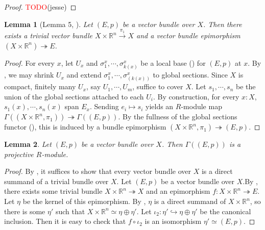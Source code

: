 \documentclass[11pt]{article}
\newcommand{\R}{\mathbb{R}}
\newcommand{\remph}[1]{\textcolor{red}{#1}}
\newcommand{\TODO}{\remph{TODO}}
\theoremstyle{plain}
\newtheorem{lemma}{Lemma}[section]
\theoremstyle{definition}
\begin{document}
\begin{proof}
  \TODO(jesse)
\end{proof}

\begin{lemma}[Lemma 5, \cite{swan1962vector}]\label{lemma:free-resolution}
  Let \((E,p)\) be a vector bundle over \(X\). Then there exists a trivial vector bundle \(X \times \R^n \overset{\pi_1}{\to} X\) and a vector bundle epimorphism \((X \times \R^n) \twoheadrightarrow E\).
\end{lemma}

\begin{proof}
  For every \(x\), let \(U_x\) and \(\sigma^x_1, \cdots, \sigma^x_{k(x)}\) be a local base () for \((E,p)\) at \(x\). By , we may shrink \(U_x\) and extend \(\sigma^x_1, \cdots, \sigma^x_{(k(x))}\) to global sections. Since \(X\) is compact, finitely many \(U_x\), say \(U_1, \cdots, U_m\), suffice to cover \(X\). Let \(s_1, \cdots, s_n\) be the union of the global sections attached to each \(U_i\). By construction, for every \(x : X\), \(s_1(x), \cdots, s_n(x)\) span \(E_x\). Sending \(e_i \mapsto s_i\) yields an \(R\)-module map \(\Gamma((X \times \R^n, \pi_1)) \twoheadrightarrow \Gamma((E,p))\). By the fullness of the global sections functor (), this is induced by a bundle epimorphism \((X \times \R^n, \pi_1) \twoheadrightarrow (E,p)\).
\end{proof}


\begin{lemma}
  \label{lemma:global-sections-projective}
  Let \((E,p)\) be a vector bundle over \(X\). Then \(\Gamma((E,p))\) is a projective \(R\)-module.
\end{lemma}

\begin{proof}
  By , it suffices to show that every vector bundle over \(X\) is a direct summand of a trivial bundle over \(X\). Let \((E,p)\) be a vector bundle over \(X\).By , there exists some trivial bundle \(X \times \R^n \twoheadrightarrow X\) and an epimorphism \(f : X \times \R^n \twoheadrightarrow E\). Let \(\eta\) be the kernel of this epimorphism. By , \(\eta\) is a direct summand of \(X \times \R^n\), so there is some \(\eta'\) such that \(X \times \R^n \simeq \eta \oplus \eta'\). Let \(\iota_2 : \eta' \hookrightarrow \eta \oplus \eta'\) be the canonical inclusion. Then it is easy to check that \(f \circ \iota_2\) is an isomorphism \(\eta' \simeq (E,p)\).
\end{proof}
\end{document}

